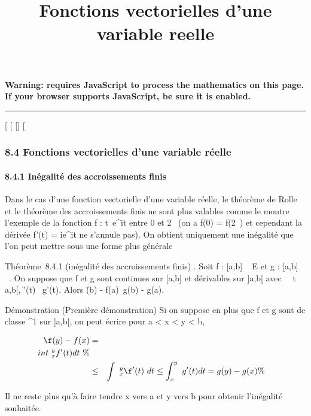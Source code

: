 \documentclass[]{article}
\title{Fonctions vectorielles d'une variable reelle}
\author{}
\date{}
\begin{document}
\maketitle

\textbf{Warning: 
requires JavaScript to process the mathematics on this page.\\ If your
browser supports JavaScript, be sure it is enabled.}

\begin{center}\rule{3in}{0.4pt}\end{center}

{[}
{[}
{[}{]}
{[}

\subsubsection{8.4 Fonctions vectorielles d'une variable réelle}

\paragraph{8.4.1 Inégalité des accroissements finis}

Dans le cas d'une fonction vectorielle d'une variable réelle, le
théorème de Rolle et le théorème des accroissements finis ne sont plus
valables comme le montre l'exemple de la fonction f :
t\mapsto~e^it entre 0 et 2\pi~ (on a f(0) =
f(2\pi~) et cependant la dérivée f'(t) = ie^it ne s'annule pas).
On obtient uniquement une inégalité que l'on peut mettre sous une forme
plus générale

Théorème~8.4.1 (inégalité des accroissements finis) . Soit f : {[}a,b{]}
\rightarrow~ E et g : {[}a,b{]} \rightarrow~ ~. On suppose que f et g sont continues sur
{[}a,b{]} et dérivables sur {]}a,b{[} avec \forall~~t
\in{]}a,b{[}, \f'(t)\ \leq
g'(t). Alors \f(b) -
f(a)\ \leq g(b) - g(a).

Démonstration (Première démonstration) Si on suppose en plus que f et g
sont de classe ^1 sur {]}a,b{[}, on peut écrire pour a
\textless{} x \textless{} y \textless{} b,

\begin{align*} \f(y) -
f(x)& =&
\\int ~
_x^yf'(t) dt\ \%&
\\ & \leq& \int ~
_x^y\f'(t)\
dt \leq\int  _x^y~g'(t) dt = g(y) -
g(x)\%& \\
\end{align*}

Il ne reste plus qu'à faire tendre x vers a et y vers b pour obtenir
l'inégalité souhaitée.
\end{document}
